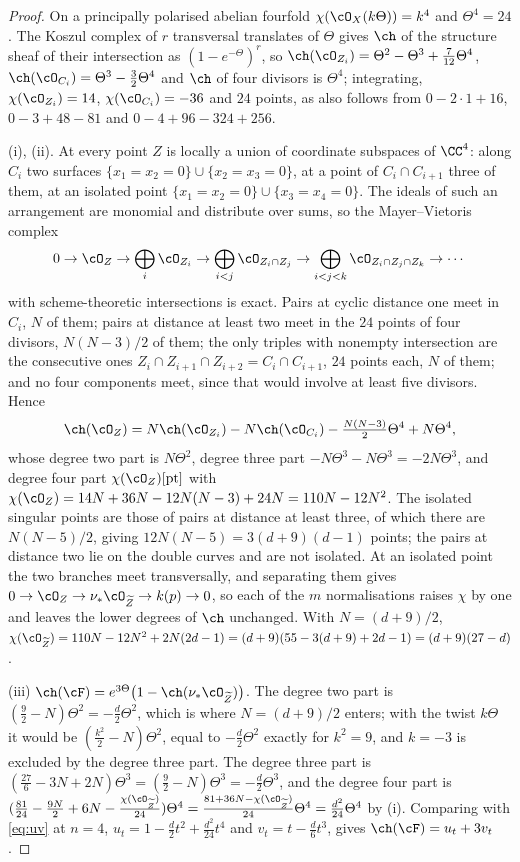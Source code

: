 \begin{proof}
On a principally polarised abelian fourfold $\chi(\cO_{X}(k\Theta))=k^{4}$
and $\Theta^{4}=24$. The Koszul complex of $r$ transversal translates of
$\Theta$ gives $\ch$ of the structure sheaf of their intersection as
$(1-e^{-\Theta})^{r}$, so $\ch(\cO_{Z_{i}})=\Theta^{2}-\Theta^{3}+\tfrac{7}{12}\Theta^{4}$,
$\ch(\cO_{C_{i}})=\Theta^{3}-\tfrac32\Theta^{4}$ and $\ch$ of four divisors
is $\Theta^{4}$; integrating, $\chi(\cO_{Z_{i}})=14$, $\chi(\cO_{C_{i}})=-36$
and $24$ points, as also follows from $0-2\cdot1+16$, $0-3+48-81$ and
$0-4+96-324+256$.

(i), (ii). At every point $Z$ is locally a union of coordinate subspaces of
$\CC^{4}$: along $C_{i}$ two surfaces $\{x_{1}=x_{2}=0\}\cup\{x_{2}=x_{3}=0\}$,
at a point of $C_{i}\cap C_{i+1}$ three of them, at an isolated point
$\{x_{1}=x_{2}=0\}\cup\{x_{3}=x_{4}=0\}$. The ideals of such an arrangement
are monomial and distribute over sums, so the Mayer--Vietoris complex
\[
  0\to\cO_{Z}\to\bigoplus_{i}\cO_{Z_{i}}\to\bigoplus_{i<j}\cO_{Z_{i}\cap Z_{j}}
  \to\bigoplus_{i<j<k}\cO_{Z_{i}\cap Z_{j}\cap Z_{k}}\to\cdots
\]
with scheme-theoretic intersections is exact. Pairs at cyclic distance one
meet in $C_{i}$, $N$ of them; pairs at distance at least two meet in the $24$
points of four divisors, $N(N-3)/2$ of them; the only triples with nonempty
intersection are the consecutive ones $Z_{i}\cap Z_{i+1}\cap Z_{i+2}=C_{i}\cap C_{i+1}$,
$24$ points each, $N$ of them; and no four components meet, since that would
involve at least five divisors. Hence
\[
  \ch(\cO_{Z})=N\ch(\cO_{Z_{i}})-N\ch(\cO_{C_{i}})-\tfrac{N(N-3)}{2}\Theta^{4}+N\Theta^{4},
\]
whose degree two part is $N\Theta^{2}$, degree three part
$-N\Theta^{3}-N\Theta^{3}=-2N\Theta^{3}$, and degree four part
$\chi(\cO_{Z})[\mathrm{pt}]$ with $\chi(\cO_{Z})=14N+36N-12N(N-3)+24N=110N-12N^{2}$.
The isolated singular points are those of pairs at distance at least three,
of which there are $N(N-5)/2$, giving $12N(N-5)=3(d+9)(d-1)$ points; the
pairs at distance two lie on the double curves and are not isolated. At an
isolated point the two branches meet transversally, and separating them
gives $0\to\cO_{Z}\to\nu_{*}\cO_{\widetilde Z}\to k(p)\to0$, so each of the
$m$ normalisations raises $\chi$ by one and leaves the lower degrees of
$\ch$ unchanged. With $N=(d+9)/2$,
$\chi(\cO_{\widetilde Z})=110N-12N^{2}+2N(2d-1)=(d+9)(55-3(d+9)+2d-1)=(d+9)(27-d)$.

(iii) $\ch(\cF)=e^{3\Theta}\bigl(1-\ch(\nu_{*}\cO_{\widetilde Z})\bigr)$. The
degree two part is $(\tfrac92-N)\Theta^{2}=-\tfrac d2\Theta^{2}$, which is
where $N=(d+9)/2$ enters; with the twist $k\Theta$ it would be
$(\tfrac{k^{2}}{2}-N)\Theta^{2}$, equal to $-\tfrac d2\Theta^{2}$ exactly for
$k^{2}=9$, and $k=-3$ is excluded by the degree three part. The degree three
part is $(\tfrac{27}{6}-3N+2N)\Theta^{3}=(\tfrac92-N)\Theta^{3}=-\tfrac d2\Theta^{3}$,
and the degree four part is
$(\tfrac{81}{24}-\tfrac{9N}{2}+6N-\tfrac{\chi(\cO_{\widetilde Z})}{24})\Theta^{4}
=\tfrac{81+36N-\chi(\cO_{\widetilde Z})}{24}\Theta^{4}=\tfrac{d^{2}}{24}\Theta^{4}$
by (i). Comparing with \eqref{eq:uv} at $n=4$,
$u_{t}=1-\tfrac d2t^{2}+\tfrac{d^{2}}{24}t^{4}$ and $v_{t}=t-\tfrac d6t^{3}$,
gives $\ch(\cF)=u_{t}+3v_{t}$.


\end{proof}
